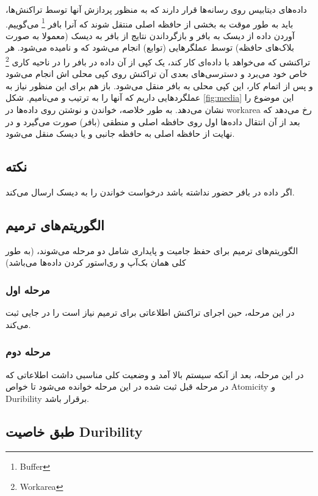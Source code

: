 داده‌های دیتابیس روی رسانه‌ها قرار دارند که به منظور پردازش آنها توسط
تراکنش‌ها،‌ باید به طور موقت به بخشی از حافظه اصلی منتقل شوند که آنرا بافر
\footnote{Buffer} می‌گوییم. آوردن داده از دیسک به بافر و بازگرداندن نتایج از
بافر به دیسک (معمولا به صورت بلاک‌های حافظه) توسط عملگر‌هایی (توابع) انجام
می‌شود که  و  نامیده می‌شود. هر تراکنشی که می‌خواهد با
داده‌ای کار کند، یک کپی از آن داده در بافر را در ناحیه کاری \footnote{Workarea}
خاص خود می‌برد و دسترسی‌های بعدی آن تراکنش روی کپی محلی اش انجام می‌شود و پس از
اتمام کار، این کپی محلی به بافر منقل می‌شود. باز هم برای این منظور نیاز به
عملگردهایی داریم که آنها را به ترتیب  و  می‌نامیم. شکل
\ref{fig:media} این موضوع را نشان می‌دهد. به طور خلاصه، خواندن و نوشتن روی
داده‌ها در workarea رخ می‌دهد که بعد از آن انتقال داده‌ها اول روی حافظه اصلی و
منطقی (بافر) صورت می‌گیرد و در نهایت از حافظه اصلی به حافظه جانبی و یا دیسک منقل
می‌شود.

\subsection*{نکته}

اگر داده در بافر حضور نداشته باشد درخواست خواندن را به دیسک ارسال می‌کند.

\subsection{الگوریتم‌های ترمیم}

الگوریتم‌های ترمیم برای حفظ جامیت و پایداری شامل دو مرحله می‌شوند، (به طور کلی
همان بک‌آپ و ری‌استور کردن داده‌ها می‌باشد)

\subsubsection{مرحله اول}

در این مرحله، حین اجرای تراکنش اطلاعاتی برای ترمیم نیاز است را در جایی ثبت
می‌کند.

\subsubsection{مرحله دوم}

در این مرحله، بعد از آنکه سیستم بالا آمد و وضعیت کلی مناسبی داشت اطلاعاتی که در
مرحله قبل ثبت شده در این مرحله خوانده می‌شود تا خواص Atomicity و Duribility
برقرار باشد.

\subsection*{طبق خاصیت Duribility}

